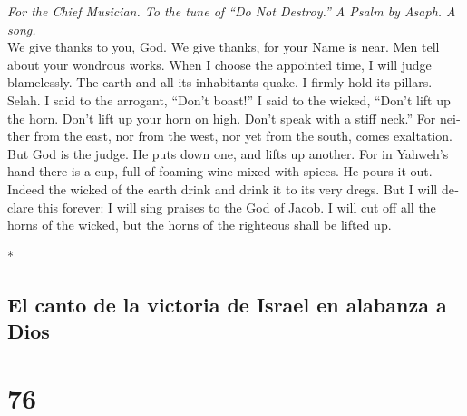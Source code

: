 \begin{paracol}{2}
\begin{otherlanguage}{english}
\emph{For the Chief Musician. To the tune of ``Do Not Destroy.'' A Psalm
by Asaph. A song.}\\
 We give thanks to you, God. We give thanks, for your Name
is near. Men tell about your wondrous works.  When I
choose the appointed time, I will judge blamelessly.  The
earth and all its inhabitants quake. I firmly hold its pillars. Selah.
 I said to the arrogant, ``Don't boast!'' I said to the
wicked, ``Don't lift up the horn.  Don't lift up your horn
on high. Don't speak with a stiff neck.''  For neither
from the east, nor from the west, nor yet from the south, comes
exaltation.  But God is the judge. He puts down one, and
lifts up another.  For in Yahweh's hand there is a cup,
full of foaming wine mixed with spices. He pours it out. Indeed the
wicked of the earth drink and drink it to its very dregs. 
But I will declare this forever: I will sing praises to the God of
Jacob.  I will cut off all the horns of the wicked, but
the horns of the righteous shall be lifted up.

\end{otherlanguage}

\switchcolumn[0]*

\hypertarget{el-canto-de-la-victoria-de-israel-en-alabanza-a-dios}{%
\subsection{El canto de la victoria de Israel en alabanza a
Dios}\label{el-canto-de-la-victoria-de-israel-en-alabanza-a-dios}}

\hypertarget{section-150}{%
\section{76}\label{section-150}}


\end{paracol}
